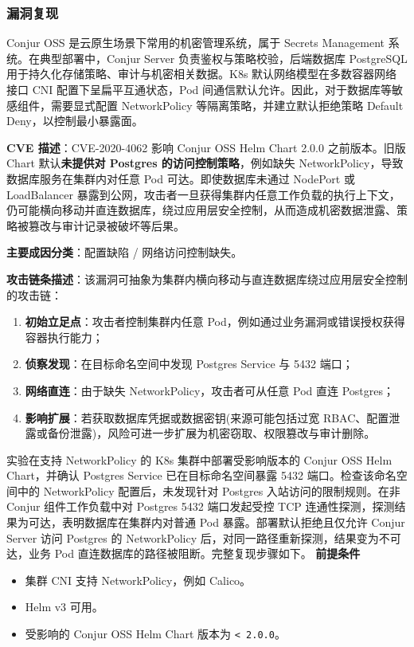 
\subsubsection{漏洞复现}



Conjur OSS 是云原生场景下常用的机密管理系统，属于 Secrets Management 系统。在典型部署中，Conjur Server 负责鉴权与策略校验，后端数据库 PostgreSQL 用于持久化存储策略、审计与机密相关数据。K8s 默认网络模型在多数容器网络接口 CNI 配置下呈扁平互通状态，Pod 间通信默认允许。因此，对于数据库等敏感组件，需要显式配置 NetworkPolicy 等隔离策略，并建立默认拒绝策略 Default Deny，以控制最小暴露面。

\textbf{CVE 描述}：CVE-2020-4062 影响 Conjur OSS Helm Chart 2.0.0 之前版本。旧版 Chart 默认\textbf{未提供对 Postgres 的访问控制策略}，例如缺失 NetworkPolicy，导致数据库服务在集群内对任意 Pod 可达。即使数据库未通过 NodePort 或 LoadBalancer 暴露到公网，攻击者一旦获得集群内任意工作负载的执行上下文，仍可能横向移动并直连数据库，绕过应用层安全控制，从而造成机密数据泄露、策略被篡改与审计记录被破坏等后果。

\textbf{主要成因分类}：配置缺陷 / 网络访问控制缺失。

\textbf{攻击链条描述}：该漏洞可抽象为集群内横向移动与直连数据库绕过应用层安全控制的攻击链：
\begin{enumerate}
    \item \textbf{初始立足点}：攻击者控制集群内任意 Pod，例如通过业务漏洞或错误授权获得容器执行能力；
    \item \textbf{侦察发现}：在目标命名空间中发现 Postgres Service 与 5432 端口；
    \item \textbf{网络直连}：由于缺失 NetworkPolicy，攻击者可从任意 Pod 直连 Postgres；
    \item \textbf{影响扩展}：若获取数据库凭据或数据密钥(来源可能包括过宽 RBAC、配置泄露或备份泄露)，风险可进一步扩展为机密窃取、权限篡改与审计删除。
\end{enumerate}


实验在支持 NetworkPolicy 的 K8s 集群中部署受影响版本的 Conjur OSS Helm Chart，并确认 Postgres Service 已在目标命名空间暴露 5432 端口。检查该命名空间中的 NetworkPolicy 配置后，未发现针对 Postgres 入站访问的限制规则。在非 Conjur 组件工作负载中对 Postgres 5432 端口发起受控 TCP 连通性探测，探测结果为可达，表明数据库在集群内对普通 Pod 暴露。部署默认拒绝且仅允许 Conjur Server 访问 Postgres 的 NetworkPolicy 后，对同一路径重新探测，结果变为不可达，业务 Pod 直连数据库的路径被阻断。完整复现步骤如下。
\textbf{前提条件}
\begin{itemize}
  \item 集群 CNI 支持 NetworkPolicy，例如 Calico。
  \item Helm v3 可用。
  \item 受影响的 Conjur OSS Helm Chart 版本为 \texttt{< 2.0.0}。
\end{itemize}

